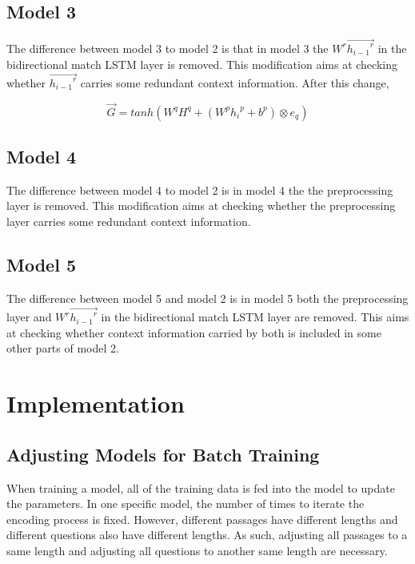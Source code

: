 \documentclass[modernstyle,12pt]{sjsuthesis}
\theoremstyle{definition}
\begin{document}
\section{Model 3}

The difference between model 3 to model 2 is that in model 3 the $W^r\overrightarrow{{h_{i-1}}^r}$ in the bidirectional match LSTM layer is removed. This modification aims at checking whether $\overrightarrow{{h_{i-1}}^r}$ carries some redundant context information. After this change,


$$\overrightarrow{G} = tanh(W^qH^q + (W^p{h_i}^p + b^p) \otimes e_q)$$


\section{Model 4}

The difference between model 4 to model 2 is in model 4 the the preprocessing layer is removed. This modification aims at checking whether the preprocessing layer carries some redundant context information.

\section{Model 5}

The difference between model 5 and model 2 is in model 5 both the preprocessing layer and $W^r\overrightarrow{{h_{i-1}}^r}$ in the bidirectional match LSTM layer are removed. This aims at checking whether context information carried by both is included in some other parts of model 2.

\chapter{Implementation}

\section{Adjusting Models for Batch Training}\label{sect:padding}

When training a model, all of the training data is fed into the model to update the parameters. In one specific model, the number of times to iterate the encoding process is fixed. However, different passages have different lengths and different questions also have different lengths. As such, adjusting all passages to a same length and adjusting all questions to another same length are necessary.
\end{document}
